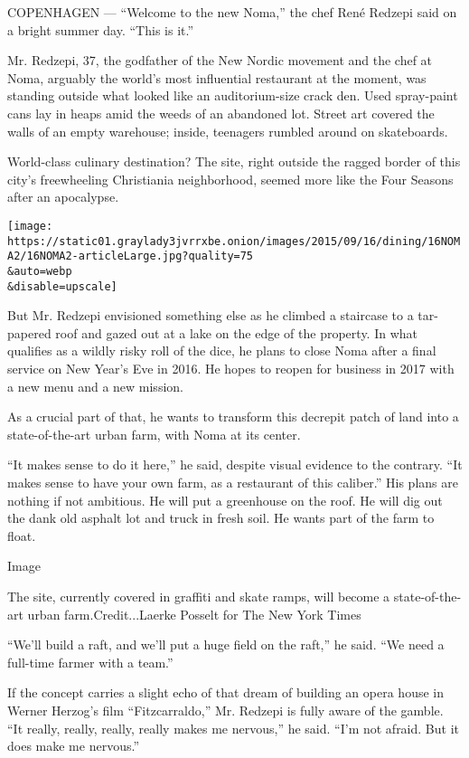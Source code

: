 COPENHAGEN --- ``Welcome to the new Noma,'' the chef René Redzepi said
on a bright summer day. ``This is it.''

Mr. Redzepi, 37, the godfather of the New Nordic movement and the chef
at Noma, arguably the world's most influential restaurant at the moment,
was standing outside what looked like an auditorium-size crack den. Used
spray-paint cans lay in heaps amid the weeds of an abandoned lot. Street
art covered the walls of an empty warehouse; inside, teenagers rumbled
around on skateboards.

World-class culinary destination? The site, right outside the ragged
border of this city's freewheeling Christiania neighborhood, seemed more
like the Four Seasons after an apocalypse.

\texttt{[image: https://static01.graylady3jvrrxbe.onion/images/2015/09/16/dining/16NOMA2/16NOMA2-articleLarge.jpg?quality=75\\\&auto=webp\\\&disable=upscale]}

But Mr. Redzepi envisioned something else as he climbed a staircase to a
tar-papered roof and gazed out at a lake on the edge of the property. In
what qualifies as a wildly risky roll of the dice, he plans to close
Noma after a final service on New Year's Eve in 2016. He hopes to reopen
for business in 2017 with a new menu and a new mission.

As a crucial part of that, he wants to transform this decrepit patch of
land into a state-of-the-art urban farm, with Noma at its center.

``It makes sense to do it here,'' he said, despite visual evidence to
the contrary. ``It makes sense to have your own farm, as a restaurant of
this caliber.'' His plans are nothing if not ambitious. He will put a
greenhouse on the roof. He will dig out the dank old asphalt lot and
truck in fresh soil. He wants part of the farm to float.

Image

The site, currently covered in graffiti and skate ramps, will become a
state-of-the-art urban farm.Credit...Laerke Posselt for The New York
Times

``We'll build a raft, and we'll put a huge field on the raft,'' he said.
``We need a full-time farmer with a team.''

If the concept carries a slight echo of that dream of building an opera
house in Werner Herzog's film ``Fitzcarraldo,'' Mr. Redzepi is fully
aware of the gamble. ``It really, really, really, really makes me
nervous,'' he said. ``I'm not afraid. But it does make me nervous.''

